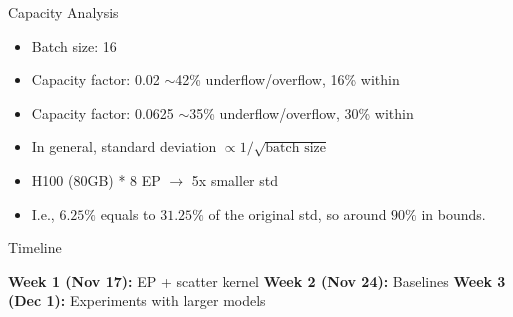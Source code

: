 \documentclass{beamer}
\begin{document}
\begin{frame}{Capacity Analysis}

\begin{itemize}
    \item Batch size: 16
    \item Capacity factor: 0.02 $\sim$42\% underflow/overflow, 16\% within
    \item Capacity factor: 0.0625 $\sim$35\% underflow/overflow, 30\% within
    \item In general, standard deviation $\propto 1/\sqrt{\text{batch size}}$
    \item H100 (80GB) * 8 EP $\rightarrow$ 5x smaller std
    \item I.e., $6.25\%$ equals to $31.25\%$ of the original std, so around $90\%$ in bounds.
\end{itemize}

\end{frame}

\begin{frame}{Timeline}

\textbf{Week 1 (Nov 17):} EP + scatter kernel
\textbf{Week 2 (Nov 24):} Baselines
\textbf{Week 3 (Dec 1):} Experiments with larger models

\end{frame}


\end{document}
